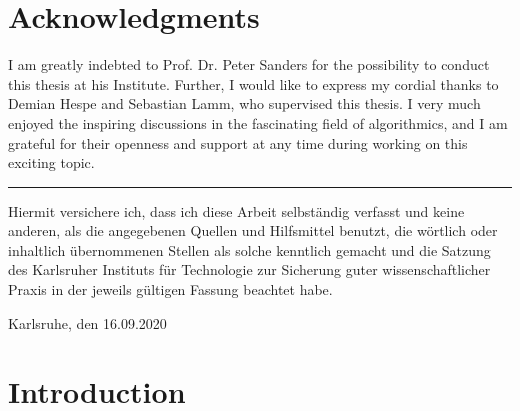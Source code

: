 \documentclass[12pt,a4paper,twoside]{scrartcl}
\numberwithin{equation}{section}
\begin{document}

\clearpage



\section*{Acknowledgments}

I am greatly indebted to Prof. Dr. Peter Sanders for the possibility to conduct this thesis at his Institute. Further, I would like to express my cordial thanks to Demian Hespe and Sebastian Lamm, who supervised this thesis. I very much enjoyed the inspiring discussions in the fascinating field of algorithmics, and I am grateful for their openness and support at any time during working on this exciting topic. 

\vfill\vfill\vfill
\vspace*{0pt}\vfill

\hrule\medskip

Hiermit versichere ich, dass ich diese Arbeit selbständig verfasst und keine anderen, als die angegebenen Quellen und Hilfsmittel benutzt, die wörtlich oder inhaltlich übernommenen Stellen als solche kenntlich gemacht und die Satzung des Karlsruher Instituts für Technologie zur Sicherung guter wissenschaftlicher Praxis in der jeweils gültigen Fassung beachtet habe.

\bigskip

\noindent
Karlsruhe, den 16.09.2020


\vspace*{5cm}
	

\clearpage



\pagestyle{normal}
\renewcommand\sectionmark[1]{\markboth{\thesection\quad\MakeUppercase{#1}}{\thesection\quad\MakeUppercase{#1}}}
\renewcommand\subsectionmark[1]{\markright{\thesubsection\quad\MakeUppercase{#1}}}

\tableofcontents

\clearpage


\section{Introduction} \label{sec1}
\end{document}
